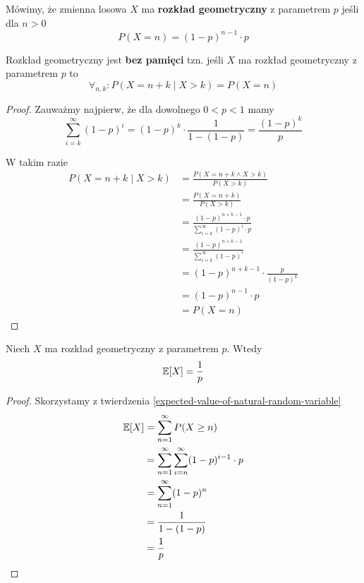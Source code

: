 \begin{definition}
	Mówimy, że zmienna losowa \( X \) ma \textbf{rozkład geometryczny} z parametrem \( p \) jeśli
	dla \( n > 0 \)
	\[
		P(X = n) = (1 - p)^{n-1} \cdot p
	\]
\end{definition}

\begin{theorem}[Lemat 2.8 P\&C]
	Rozkład geometryczny jest \textbf{bez pamięci} tzn. jeśli \( X \) ma rozkład geometryczny z parametrem \( p \) to
	\[
		\forall_{n, k} : P(X = n + k \mid X > k) = P(X = n)
	\]
\end{theorem}
\begin{proof}
	Zauważmy najpierw, że dla dowolnego \( 0 < p < 1 \) mamy
	\[
		\sum_{i=k}^\infty (1-p)^i = (1-p)^k \cdot \frac{1}{1 - (1-p)} = \frac{(1-p)^k}{p}
	\]

	W takim razie
	\begin{align*}
		P(X = n + k \mid X > k)
		 & = \frac{P(X = n + k \land X > k)}{P(X > k)}                             \\
		 & = \frac{P(X = n + k)}{P(X > k)}                                         \\
		 & = \frac{(1 - p)^{n + k - 1} \cdot p}{\sum_{i=k}^\infty (1-p)^i \cdot p} \\
		 & = \frac{(1-p)^{n + k - 1}}{\sum_{i=k}^\infty (1-p)^i}                   \\
		 & = (1-p)^{n + k - 1} \cdot \frac{p}{(1-p)^k}                             \\
		 & = (1-p)^{n-1} \cdot p                                                   \\
		 & = P(X = n)
	\end{align*}
\end{proof}

\begin{theorem}
	Niech \( X \) ma rozkład geometryczny z parametrem \( p \). Wtedy
	\[
		\expected{X} = \frac{1}{p}
	\]
\end{theorem}
\begin{proof}
	Skorzystamy z twierdzenia \ref{expected-value-of-natural-random-variable}
	\begin{align*}
		\expected{X}
		 & = \sum_{n=1}^\infty P(X \geq n)                           \\
		 & = \sum_{n=1}^\infty \sum_{i=n}^\infty (1-p)^{i-1} \cdot p \\
		 & = \sum_{n=1}^\infty (1-p)^n                               \\
		 & = \frac{1}{1 - (1-p)}                                     \\
		 & = \frac{1}{p}
	\end{align*}
\end{proof}

